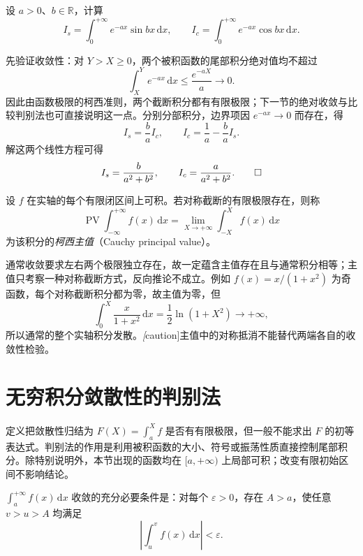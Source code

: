 \documentclass[UTF8,12pt,a4paper,fontset=fandol]{ctexbook}
\begin{document}
\begin{example}
\label{ex:exponentially-damped-trigonometric-integrals}
设 $a>0$、$b\in\mathbb{R}$，计算
\[
    I_s=\int_0^{+\infty}e^{-ax}\sin bx\,\mathrm{d}x,
    \qquad
    I_c=\int_0^{+\infty}e^{-ax}\cos bx\,\mathrm{d}x.
\]
\end{example}

\begin{solve}
先验证收敛性：对 $Y>X\geq0$，两个被积函数的尾部积分绝对值均不超过
\[
    \int_X^Y e^{-ax}\,\mathrm{d}x\leq\frac{e^{-aX}}a\longrightarrow0.
\]
因此由函数极限的柯西准则，两个截断积分都有有限极限；下一节的绝对收敛与比较判别法也可直接说明这一点。分别分部积分，边界项因 $e^{-ax}\to0$ 而存在，得
\[
    I_s=\frac ba I_c,\qquad
    I_c=\frac1a-\frac ba I_s.
\]
解这两个线性方程可得
\[
    I_s=\frac{b}{a^2+b^2},\qquad
    I_c=\frac{a}{a^2+b^2}.
    \qedhere
\]
\end{solve}

\begin{definition}[无穷积分的柯西主值]
\label{def:cauchy-principal-value-at-infinity}
设 $f$ 在实轴的每个有限闭区间上可积。若对称截断的有限极限存在，则称
\begin{equation}
    \operatorname{PV}\int_{-\infty}^{+\infty}f(x)\,\mathrm{d}x
    =\lim_{X\to+\infty}\int_{-X}^X f(x)\,\mathrm{d}x
    \label{eq:cauchy-principal-value-infinity}
\end{equation}
为该积分的\emph{柯西主值}（Cauchy principal value）。
\end{definition}

通常收敛要求左右两个极限独立存在，故一定蕴含主值存在且与通常积分相等；主值只考察一种对称截断方式，反向推论不成立。例如 $f(x)=x/(1+x^2)$ 为奇函数，每个对称截断积分都为零，故主值为零，但
\[
    \int_0^X\frac{x}{1+x^2}\,\mathrm{d}x=\frac12\ln(1+X^2)\to+\infty,
\]
所以通常的整个实轴积分发散。\emph[caution]{主值中的对称抵消不能替代两端各自的收敛性检验。}

\section{无穷积分敛散性的判别法}
\label{sec:convergence-tests-for-infinite-integrals}

定义把敛散性归结为 $F(X)=\int_a^X f$ 是否有有限极限，但一般不能求出 $F$ 的初等表达式。判别法的作用是利用被积函数的大小、符号或振荡性质直接控制尾部积分。除特别说明外，本节出现的函数均在 $[a,+\infty)$ 上局部可积；改变有限初始区间不影响结论。

\begin{theorem}[无穷积分的柯西准则]
\label{thm:cauchy-criterion-improper-integrals}
$\int_a^{+\infty}f(x)\,\mathrm{d}x$ 收敛的充分必要条件是：对每个 $\varepsilon>0$，存在 $A>a$，使任意 $v>u>A$ 均满足
\begin{equation}
    \left|\int_u^v f(x)\,\mathrm{d}x\right|<\varepsilon.
    \label{eq:improper-integral-cauchy-tail}
\end{equation}
\end{theorem}
\end{document}

